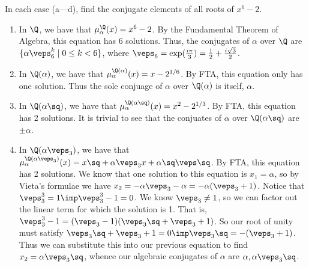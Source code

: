 \documentclass{article}
\begin{document}
\begin{subexercise}
In each case (a---d), find the conjugate elements of all roots of $ x^6-2 $.
\end{subexercise}

\begin{solution}
\begin{enumerate}[label=\alph*)]
  \item In $ \Q $, we have that $ \mu_\alpha^{\Q}(x) = x^6-2 $.
  By the Fundamental Theorem of Algebra, this equation has 6 solutions.
  Thus, the conjugates of $ \alpha $ over $ \Q $ are $ \{\alpha\veps_6^k \mid 0\leq k < 6 \} $, where $ \veps_6 = \exp(\frac{i\pi}{3}) = \frac{1}{2}+\frac{i\sqrt 3}{2} $.

  \item In $ \Q(\alpha) $, we have that $ \mu_\alpha^{\Q(\alpha)}(x) =  x - 2^{1/6} $.
  By FTA, this equation only has one solution.
  Thus the sole conjuage of $ \alpha $ over $ \Q(\alpha) $ is itself, $ \alpha $.

  \item In $ \Q(\alpha\sq) $, we have that $ \mu_\alpha^{\Q(\alpha\sq)}(x) = x^2-2^{1/3} $.
  By FTA, this equation has 2 solutions.
  It is trivial to see that the conjuates of $ \alpha $ over $ \Q(\alpha\sq) $ are $ \pm\alpha $.

  \item In $ \Q(\alpha\veps_3) $, we have that $ \mu_\alpha^{\Q(\alpha\veps_3)}(x) = x\sq+\alpha\veps_3x + \alpha\sq\veps\sq $.
  By FTA, this equation has 2 solutions.
  We know that one solution to this equation is $ x_1 = \alpha $, so by Vieta's formulae we have $ x_2 = -\alpha\veps_3 - \alpha = -\alpha(\veps_3+1) $.
  Notice that $ \veps_3^3 = 1 \imp \veps_3^3-1=0 $.
  We know $ \veps_3\neq 1 $, so we can factor out the linear term for which the solution is 1.
  That is, $ \veps_3^3-1 = (\veps_3-1)(\veps_3\sq+\veps_3+1) $.
  So our root of unity must satisfy $ \veps_3\sq+\veps_3+1 = 0 \imp \veps_3\sq=-(\veps_3+1) $.
  Thus we can substitute this into our previous equation to find $ x_2 = \alpha\veps_3\sq $, whence our algebraic conjugates of $ \alpha $ are $ \alpha, \alpha\veps_3\sq $.
\end{enumerate}
\end{solution}
\end{document}
